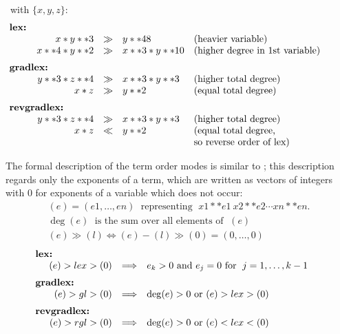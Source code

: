 \example \ with $\{x,y,z\}$: 
\[
\begin{array}{rlll}
\multicolumn{2}{l}{\hspace*{-1cm}\mbox{\bf lex:}}\\
 x * y **3 & \gg & y ** 48 & \mbox{(heavier variable)} \\
 x**4 * y**2 & \gg  & x**3 * y**10 & \mbox{(higher degree in 1st
variable)} \vspace*{2mm} \\
\multicolumn{2}{l}{\hspace*{-1cm}\mbox{\bf gradlex:}} \\
  y**3 * z**4 & \gg & x**3 * y**3 & \mbox{(higher total degree)} \\
  x*z  &        \gg & y**2  & \mbox{(equal total degree)}
\vspace*{2mm}\\
\multicolumn{2}{l}{\hspace*{-1cm}\mbox{\bf
revgradlex:}} \\
 y**3 * z**4 & \gg &  x**3 * y**3 & \mbox{(higher total degree)} \\
 x*z         & \ll  &  y**2       & \mbox{(equal total degree,} \\
 & & & \mbox{so reverse order of lex)}
\end{array}
\]

The formal description of the term order modes is similar to
\cite{Kredel:88}; this description regards only the exponents of a term,
which are written as vectors of integers with $0$ for exponents of a
variable which does not occur:
\[
\begin{array}{l}
  (e) = (e1,\ldots , en) \;\mbox{ representing }\; x1**e1 \ x2**e2 \cdots
  xn**en. \\
  \deg(e) \; \mbox{ is the sum over all elements of } \;(e) \\
  (e) \gg (l) \Longleftrightarrow (e)-(l)\gg (0) = (0,\ldots ,0)
\end{array}
\]
\[
\begin{array}{rll}
\multicolumn{1}{l}{\hspace*{-.5cm}\mbox{\bf lex:}} \\
  (e) > lex > (0) & \Longrightarrow  & e_k > 0 \mbox{ and } e_j =0
\mbox{ for }\; j=1,\ldots , k-1\vspace*{2mm} \\
\multicolumn{1}{l}{\hspace*{-.5cm}\mbox{\bf
gradlex:}} \\
  (e) >gl> (0)  & \Longrightarrow  & \deg(e)>0  \mbox { or } (e) >lex>
(0)\vspace*{2mm} \\
\multicolumn{1}{l}{\hspace*{-.5cm}\mbox{\bf
revgradlex:}}\\
  (e) >rgl> (0) & \Longrightarrow & \deg(e)>0  \mbox{ or }(e)  <lex<
(0)
\end{array}
\]

